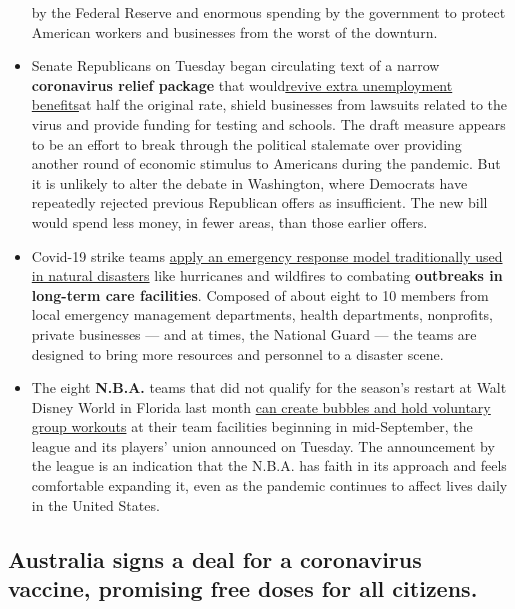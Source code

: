 \begin{itemize}
  by the Federal Reserve and enormous spending by the government to
  protect American workers and businesses from the worst of the
  downturn.
\item
  Senate Republicans on Tuesday began circulating text of a narrow
  \textbf{coronavirus relief package} that
  would\href{https://www.nytimes3xbfgragh.onion/2020/08/18/us/politics/republicans-coronavirus-stimulus-bill.html}{revive
  extra unemployment benefits}at half the original rate, shield
  businesses from lawsuits related to the virus and provide funding for
  testing and schools. The draft measure appears to be an effort to
  break through the political stalemate over providing another round of
  economic stimulus to Americans during the pandemic. But it is unlikely
  to alter the debate in Washington, where Democrats have repeatedly
  rejected previous Republican offers as insufficient. The new bill
  would spend less money, in fewer areas, than those earlier offers.
\item
  Covid-19 strike teams
  \href{https://www.nytimes3xbfgragh.onion/2020/08/18/health/Covid-nursing-homes.html}{apply
  an emergency response model traditionally used in natural disasters}
  like hurricanes and wildfires to combating \textbf{outbreaks in
  long-term care facilities}. Composed of about eight to 10 members from
  local emergency management departments, health departments,
  nonprofits, private businesses --- and at times, the National Guard
  --- the teams are designed to bring more resources and personnel to a
  disaster scene.
\item
  The eight \textbf{N.B.A.} teams that did not qualify for the season's
  restart at Walt Disney World in Florida last month
  \href{https://www.nytimes3xbfgragh.onion/2020/08/18/sports/basketball/nba-knicks-bubble.html}{can
  create bubbles and hold voluntary group workouts} at their team
  facilities beginning in mid-September, the league and its players'
  union announced on Tuesday. The announcement by the league is an
  indication that the N.B.A. has faith in its approach and feels
  comfortable expanding it, even as the pandemic continues to affect
  lives daily in the United States.
\end{itemize}

\hypertarget{australia-signs-a-deal-for-a-coronavirus-vaccine-promising-free-doses-for-all-citizens}{%
\subsection{Australia signs a deal for a coronavirus vaccine, promising
free doses for all
citizens.}\label{australia-signs-a-deal-for-a-coronavirus-vaccine-promising-free-doses-for-all-citizens}}


